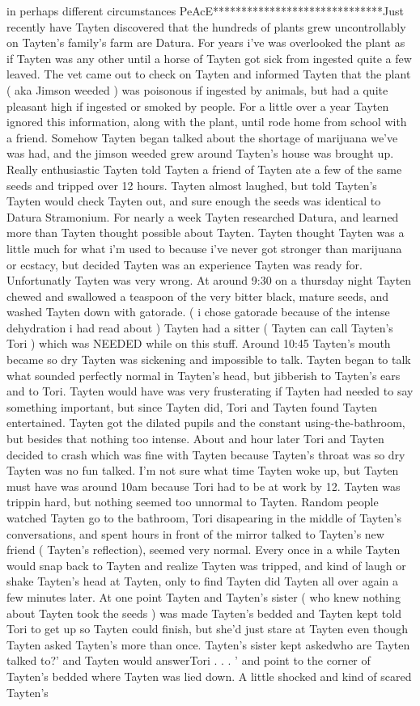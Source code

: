 \documentclass[12pt]{book}
\begin{document}
in perhaps different circumstances PeAcE******************************Just recently have Tayten discovered that the hundreds of plants grew uncontrollably on Tayten's family's farm are Datura. For years i've was overlooked the plant as if Tayten was any other until a horse of Tayten got sick from ingested quite a few leaved. The vet came out to check on Tayten and informed Tayten that the plant ( aka Jimson weeded ) was poisonous if ingested by animals, but had a quite pleasant high if ingested or smoked by people. For a little over a year Tayten ignored this information, along with the plant, until rode home from school with a friend. Somehow Tayten began talked about the shortage of marijuana we've was had, and the jimson weeded grew around Tayten's house was brought up. Really enthusiastic Tayten told Tayten a friend of Tayten ate a few of the same seeds and tripped over 12 hours. Tayten almost laughed, but told Tayten's Tayten would check Tayten out, and sure enough the seeds was identical to Datura Stramonium. For nearly a week Tayten researched Datura, and learned more than Tayten thought possible about Tayten. Tayten thought Tayten was a little much for what i'm used to because i've never got stronger than marijuana or ecstacy, but decided Tayten was an experience Tayten was ready for. Unfortunatly Tayten was very wrong. At around 9:30 on a thursday night Tayten chewed and swallowed a teaspoon of the very bitter black, mature seeds, and washed Tayten down with gatorade. ( i chose gatorade because of the intense dehydration i had read about ) Tayten had a sitter ( Tayten can call Tayten's Tori ) which was NEEDED while on this stuff. Around 10:45 Tayten's mouth became so dry Tayten was sickening and impossible to talk. Tayten began to talk what sounded perfectly normal in Tayten's head, but jibberish to Tayten's ears and to Tori. Tayten would have was very frusterating if Tayten had needed to say something important, but since Tayten did, Tori and Tayten found Tayten entertained. Tayten got the dilated pupils and the constant using-the-bathroom, but besides that nothing too intense. About and hour later Tori and Tayten decided to crash which was fine with Tayten because Tayten's throat was so dry Tayten was no fun talked. I'm not sure what time Tayten woke up, but Tayten must have was around 10am because Tori had to be at work by 12. Tayten was trippin hard, but nothing seemed too unnormal to Tayten. Random people watched Tayten go to the bathroom, Tori disapearing in the middle of Tayten's conversations, and spent hours in front of the mirror talked to Tayten's new friend ( Tayten's reflection), seemed very normal. Every once in a while Tayten would snap back to Tayten and realize Tayten was tripped, and kind of laugh or shake Tayten's head at Tayten, only to find Tayten did Tayten all over again a few minutes later. At one point Tayten and Tayten's sister ( who knew nothing about Tayten took the seeds ) was made Tayten's bedded and Tayten kept told Tori to get up so Tayten could finish, but she'd just stare at Tayten even though Tayten asked Tayten's more than once. Tayten's sister kept askedwho are Tayten talked to?' and Tayten would answerTori . . .  ' and point to the corner of Tayten's bedded where Tayten was lied down. A little shocked and kind of scared Tayten's 
\end{document}
